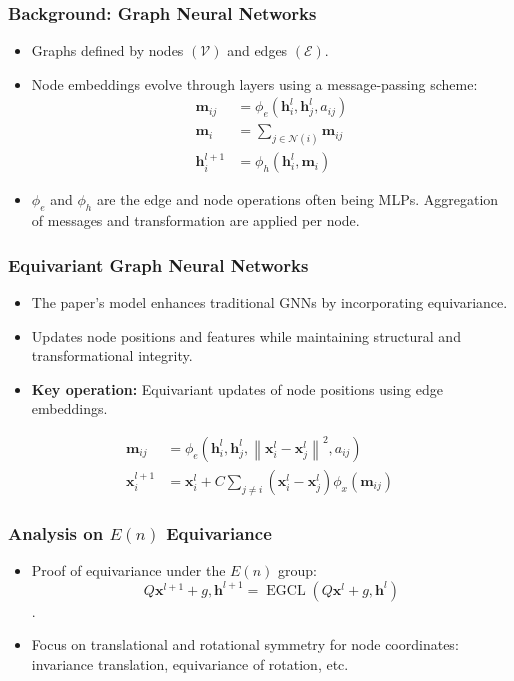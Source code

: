 \documentclass[11pt,xcolor={dvipsnames},hyperref={pdftex,pdfpagemode=UseNone,hidelinks,pdfdisplaydoctitle=true},usepdftitle=false]{beamer}
\newcommand{\rmm}{\mathbf{m}}
\newcommand{\rmh}{\mathbf{h}}
\newcommand{\rmx}{\mathbf{x}}
\begin{document}
\begin{frame}
\frametitle{Background: Graph Neural Networks}
\begin{itemize}
      \item Graphs defined by nodes $(\mathcal{V})$ and edges $(\mathcal{E})$.
      \item Node embeddings evolve through layers using a message-passing scheme:
      \begin{equation}
        \begin{aligned}
        \mathbf{m}_{i j} & =\phi_e\left(\mathbf{h}_i^l, \mathbf{h}_j^l, a_{i j}\right) \\
        \mathbf{m}_i & =\sum_{j \in \mathcal{N}(i)} \mathbf{m}_{i j} \\
        \mathbf{h}_i^{l+1} & =\phi_h\left(\mathbf{h}_i^l, \mathbf{m}_i\right)
        \end{aligned}
        \end{equation}
      \item $\phi_e$ and $\phi_h$ are the edge and node operations often being MLPs. Aggregation of messages and transformation are applied per node.
\end{itemize}
\end{frame}

\begin{frame}
\frametitle{Equivariant Graph Neural Networks}
\begin{itemize}
      \item The paper's  model enhances traditional GNNs by incorporating equivariance.
      \item Updates node positions and features while maintaining structural and transformational integrity.
      \item \textbf{Key operation:} Equivariant updates of node positions using edge embeddings.
\end{itemize}
\begin{align}
\rmm_{ij} &=\phi_{e}\left(\rmh_{i}^{l}, \rmh_{j}^{l},\left\|\rmx_{i}^{l}-\rmx_{j}^{l}\right\|^{2}, a_{i j}\right) \\
\rmx_{i}^{l+1} &=\rmx_{i}^{l}+ C\sum_{j \neq i}\left(\rmx_{i}^{l}-\rmx_{j}^{l}\right) \phi_{x}\left(\rmm_{ij}\right)
\end{align}
\end{frame}

\begin{frame}
\frametitle{Analysis on $E(n)$ Equivariance}
\begin{itemize}
      \item Proof of equivariance under the $E(n)$ group: $$Q \mathbf{x}^{l+1}+g, \mathbf{h}^{l+1}=\operatorname{EGCL}\left(Q \mathbf{x}^l+g, \mathbf{h}^l\right)$$.
      \item Focus on translational and rotational symmetry for node coordinates: invariance translation, equivariance of rotation, etc. 
\end{itemize}
\end{frame}
\end{document}
